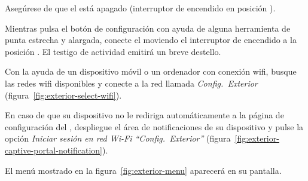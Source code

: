 \begin{enumeratecompact}

\item Asegúrese de que el \ME está apagado (interruptor de encendido  en posición \off).

\item Mientras pulsa el botón de configuración  con ayuda de alguna herramienta de punta estrecha y alargada, conecte el \ME moviendo el interruptor de encendido  a la posición \on. El testigo de actividad  emitirá un breve destello. 

\item Con la ayuda de un dispositivo móvil o un ordenador con conexión wifi, busque las redes wifi disponibles y conecte a la red llamada \emph{Config.~Exterior} (figura~\ref{fig:exterior-select-wifi}).

\item En caso de que su dispositivo no le rediriga automáticamente a la página de configuración del \ME, despliegue el área de notificaciones de su dispositivo y pulse la opción \emph{Iniciar sesión en red Wi-Fi ``Config.~Exterior''} (figura~\ref{fig:exterior-captive-portal-notification}).

\item El menú mostrado en la figura~\ref{fig:exterior-menu} aparecerá en su pantalla.

\end{enumeratecompact}

